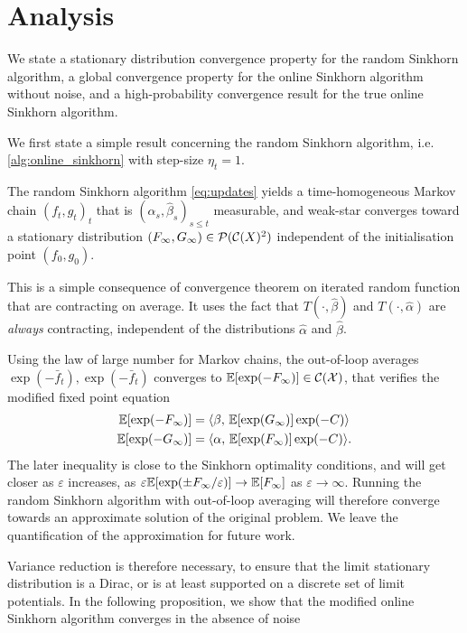 \section{Analysis}

We state a stationary distribution convergence property for the random Sinkhorn
algorithm, a global convergence property for the online Sinkhorn algorithm
without noise, and a high-probability convergence result for the true online
Sinkhorn algorithm.

We first state a simple result concerning the random Sinkhorn algorithm, i.e.
\autoref{alg:online_sinkhorn} with step-size $\eta_t = 1$.

\begin{proposition}\label{prop:markov}
    The random Sinkhorn algorithm \eqref{eq:updates} yields a time-homogeneous
    Markov chain ${(f_t, g_t)}_t$ that is $(\hat \alpha_s, \hat \beta_s)_{s \leq
    t}$ measurable, and weak-star converges toward a stationary distribution
    $(F_\infty, G_\infty) \in \mathcal{P}(\mathcal{C}(X)^2)$ independent of the initialisation
    point $(f_0, g_0)$.
\end{proposition}

This is a simple consequence of \citep{diaconis_iterated} convergence theorem on
iterated random function that are contracting on average. It uses the fact that
$T(\cdot,\hat \beta)$ and $T(\cdot,\hat \alpha)$ are \textit{always}
contracting, independent of the distributions $\hat \alpha$ and $\hat \beta$.

Using the law of large number for Markov chains, the out-of-loop averages
$\exp(-\bar f_t), \exp(-\bar f_t)$ converges to $\mathbb{E}[\exp(-F_\infty)] \in
\mathcal{C}(\mathcal{X})$, that verifies the modified fixed point equation
\begin{align}
    \mathbb{E}[\exp(-F_\infty)] &=
     \langle \beta,\,\mathbb{E}[\exp(G_\infty)] \exp(-C)\rangle \\
    \mathbb{E}[\exp(-G_\infty)] &=
     \langle \alpha,\,\mathbb{E}[\exp(F_\infty)] \exp(-C)\rangle.
\end{align}
The later inequality is close to the Sinkhorn optimality conditions, and will
get closer as $\varepsilon$ increases, as $\varepsilon \mathbb{E}[\exp(\pm F_\infty /
\varepsilon)] \to \mathbb{E}[F_\infty]$ as $\varepsilon \to \infty$. Running the random
Sinkhorn algorithm with out-of-loop averaging will therefore converge towards an
approximate solution of the original problem. We leave the quantification of the
approximation for future work.

Variance reduction is therefore necessary, to ensure that the limit stationary
distribution is a Dirac, or is at least supported on a discrete set of limit
potentials. In the following proposition, we show that the modified online Sinkhorn algorithm converges in the absence of noise

